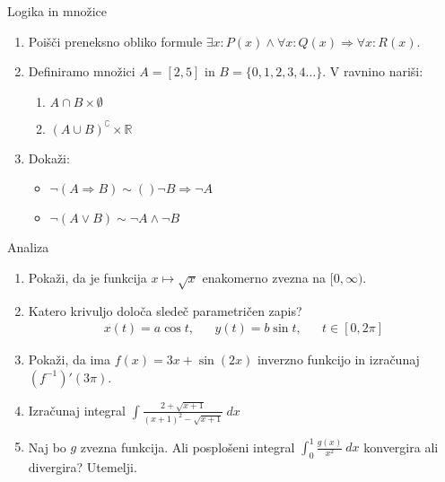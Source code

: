 \begin{frame}{Logika in množice}
	\begin{enumerate}
		\item
		Poišči preneksno obliko formule 
		$\exists x:P(x) \wedge \forall x : Q(x) \Rightarrow \forall x : R(x)$.
		\item 
		Definiramo množici $A=[2,5]$ in $B=\{0,1,2,3,4 \dots\}$.
		V ravnino nariši:
		\begin{enumerate}
		   \item $A \cap B \times \emptyset$
		   \item $(A \cup B)^\complement \times \mathbb{R}$
		\end{enumerate}
		\item
		Dokaži:
		\begin{itemize}
			\item $\neg (A \Rightarrow B) \sim ()\neg B \Rightarrow \neg A$
			\item $\neg (A \vee B) \sim \neg A \wedge \neg B$
		\end{itemize}
	\end{enumerate}
\end{frame}

\begin{frame}{Analiza}
	\begin{enumerate}
		\item
		Pokaži, da je funkcija $x \mapsto \sqrt{x}$ enakomerno zvezna na $[0,\infty)$.
		\item 
		Katero krivuljo določa sledeč parametričen zapis?
		\begin{align*}
		   x(t) = a \cos t, & %
		   &y(t) = b \sin t, & %
		   &t \in [0, 2 \pi]
		\end{align*}
		\item
		Pokaži, da ima $f(x)=3x + \sin(2x)$ inverzno funkcijo in izračunaj $(f^{-1})'(3\pi)$.
		
		\item
		Izračunaj integral 
		$\displaystyle 
		\int \frac{2+\sqrt{x+1}}{(x+1)^2-\sqrt{x+1}} \ dx 
		$
		\item 
		Naj bo $g$ zvezna funkcija. Ali posplošeni integral 
		$\int_{0}^{1} \frac{g(x)}{x^2} \ dx$
		konvergira ali divergira? Utemelji.
	\end{enumerate}
\end{frame}

